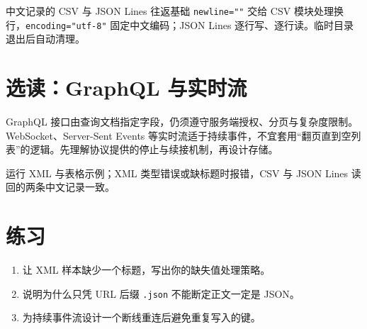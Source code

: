 \begin{example}{中文记录的 CSV 与 JSON Lines 往返}{基础}
\texttt{newline=""} 交给 CSV 模块处理换行，\texttt{encoding="utf-8"} 固定中文编码；JSON Lines 逐行写、逐行读。临时目录退出后自动清理。
\end{example}

\section{选读：GraphQL 与实时流}
GraphQL 接口由查询文档指定字段，仍须遵守服务端授权、分页与复杂度限制。WebSocket、Server-Sent Events 等实时流适于持续事件，不宜套用“翻页直到空列表”的逻辑。先理解协议提供的停止与续接机制，再设计存储。

\begin{tcolorbox}[title=本章验收,colframe=Teal,colback=Teal!3]
运行 XML 与表格示例；XML 类型错误或缺标题时报错，CSV 与 JSON Lines 读回的两条中文记录一致。
\end{tcolorbox}

\section{练习}
\begin{enumerate}[label=\arabic*.]
\item 让 XML 样本缺少一个标题，写出你的缺失值处理策略。
\item 说明为什么只凭 URL 后缀 \texttt{.json} 不能断定正文一定是 JSON。
\item 为持续事件流设计一个断线重连后避免重复写入的键。
\end{enumerate}
